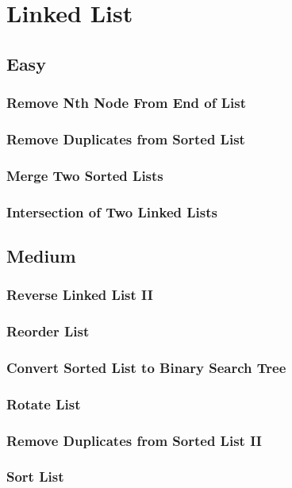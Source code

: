 \documentclass[12pt]{book}
\begin{document}
\chapter{Linked List}
\label{sec-3}
\section{Easy}
\label{sec-3-1}
\subsection{Remove Nth Node From End of List}
\label{sec-3-1-1}
\subsection{Remove Duplicates from Sorted List}
\label{sec-3-1-2}
\subsection{Merge Two Sorted Lists}
\label{sec-3-1-3}
\subsection{Intersection of Two Linked Lists}
\label{sec-3-1-4}
\section{Medium}
\label{sec-3-2}
\subsection{Reverse Linked List II}
\label{sec-3-2-1}
\subsection{Reorder List}
\label{sec-3-2-2}
\subsection{Convert Sorted List to Binary Search Tree}
\label{sec-3-2-3}
\subsection{Rotate List}
\label{sec-3-2-4}
\subsection{Remove Duplicates from Sorted List II}
\label{sec-3-2-5}
\subsection{Sort List}
\label{sec-3-2-6}
\end{document}
